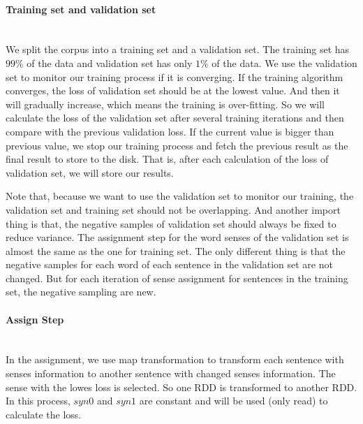 \paragraph{Training set and validation set} \ \\
We split the corpus into a training set and a validation set. The training set has $99\%$ of the data and validation set has only $1\%$ of the data. We use the validation set to monitor our training process if it is converging. If the training algorithm  converges, the loss of validation set should be at the lowest value. And then it will gradually increase, which means the training is over-fitting. So we will calculate the loss of the validation set after several training iterations and then compare with the previous validation loss. If the current value is bigger than previous value, we stop our training process and fetch the previous result as the final result to store to the disk. That is, after each calculation of the loss of validation set, we will store our results. 

Note that, because we want to use the validation set to monitor our training, the validation set and training set should not be overlapping. And another import thing is that, the negative samples of validation set should always be fixed to reduce variance.  The assignment step for the word senses of the validation set is almost the same as the one for training set. The only different thing is that the negative samples for each word of each sentence in the validation set are not changed. But for each iteration of sense assignment for sentences in the training set, the negative sampling are new. 

\paragraph{Assign Step}\ \\
In the assignment, we use map transformation to transform each sentence with senses information to another sentence with changed senses information. The sense with the lowes loss is selected. So one RDD is transformed to another RDD. In this process, $syn0$ and $syn1$ are constant and will be used (only read) to calculate the loss. 

